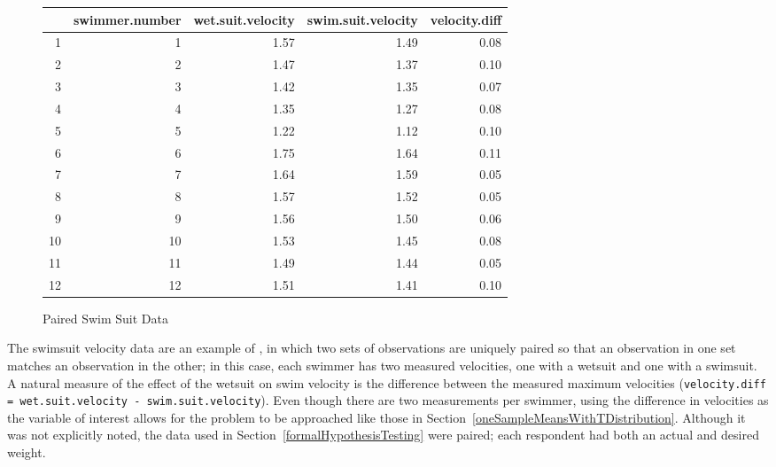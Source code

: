 \begin{figure}[ht]
	\centering
	\begin{tabular}{rrrrr}
		\hline
		& swimmer.number & wet.suit.velocity & swim.suit.velocity & velocity.diff \\ 
		\hline
		1 & 1 & 1.57 & 1.49 & 0.08 \\ 
		2 & 2 & 1.47 & 1.37 & 0.10 \\ 
		3 & 3 & 1.42 & 1.35 & 0.07 \\ 
		4 & 4 & 1.35 & 1.27 & 0.08 \\ 
		5 & 5 & 1.22 & 1.12 & 0.10 \\ 
		6 & 6 & 1.75 & 1.64 & 0.11 \\ 
		7 & 7 & 1.64 & 1.59 & 0.05 \\ 
		8 & 8 & 1.57 & 1.52 & 0.05 \\ 
		9 & 9 & 1.56 & 1.50 & 0.06 \\ 
		10 & 10 & 1.53 & 1.45 & 0.08 \\ 
		11 & 11 & 1.49 & 1.44 & 0.05 \\ 
		12 & 12 & 1.51 & 1.41 & 0.10 \\ 
		\hline
	\end{tabular}
	\caption{Paired Swim Suit Data} 
	\label{swimSuitTimes}
\end{figure}

%
%


	
The swimsuit velocity data are an example of , in which two sets of observations  are uniquely paired so that an observation in one set matches an observation in the other; in this case, each swimmer has two measured velocities, one with a wetsuit and one with a swimsuit. A natural measure of the effect of the wetsuit on swim velocity is the difference between the measured maximum velocities (\texttt{velocity.diff = wet.suit.velocity - swim.suit.velocity}). Even though there are two measurements per swimmer, using the difference in velocities as the variable of interest allows for the problem to be approached like those in Section~\ref{oneSampleMeansWithTDistribution}.  Although it was not explicitly noted, the data used in Section~\ref{formalHypothesisTesting} were paired; each respondent had both an actual and desired weight.

